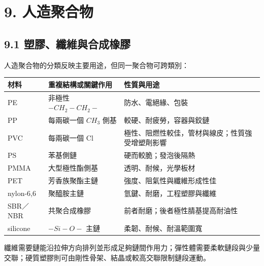 \documentclass[11pt,a4paper]{article}
\newcounter{none}
\begin{document}
\section{9. 人造聚合物}\label{ux4ebaux9020ux805aux5408ux7269}

\subsection{9.1 塑膠、纖維與合成橡膠}\label{ux5851ux81a0ux7e96ux7dadux8207ux5408ux6210ux6a61ux81a0}

人造聚合物的分類反映主要用途，但同一聚合物可跨類別：

{\def\LTcaptype{none} %
\begin{longtable}[]{@{}
  >{\raggedright\arraybackslash}p{}
  >{\raggedright\arraybackslash}p{}
  >{\raggedright\arraybackslash}p{}@{}}
\toprule\noalign{}
\begin{minipage}[b]{\linewidth}\raggedright
材料
\end{minipage} & \begin{minipage}[b]{\linewidth}\raggedright
重複結構或關鍵作用
\end{minipage} & \begin{minipage}[b]{\linewidth}\raggedright
性質與用途
\end{minipage} \\
\midrule\noalign{}
\endhead
\bottomrule\noalign{}
\endlastfoot
PE & 非極性 \(-CH_2-CH_2-\) & 防水、電絕緣、包裝 \\
PP & 每兩碳一個 \(CH_3\) 側基 & 較硬、耐疲勞，容器與鉸鏈 \\
PVC & 每兩碳一個 Cl & 極性、阻燃性較佳，管材與線皮；性質強受增塑劑影響 \\
PS & 苯基側鏈 & 硬而較脆；發泡後隔熱 \\
PMMA & 大型極性酯側基 & 透明、耐候，光學板材 \\
PET & 芳香族聚酯主鏈 & 強度、阻氣性與纖維形成性佳 \\
nylon-6,6 & 聚醯胺主鏈 & 氫鍵、耐磨，工程塑膠與纖維 \\
SBR／NBR & 共聚合成橡膠 & 前者耐磨；後者極性腈基提高耐油性 \\
silicone & \(-Si-O-\) 主鏈 & 柔韌、耐候、耐溫範圍寬 \\
\end{longtable}
}

纖維需要鏈能沿拉伸方向排列並形成足夠鏈間作用力；彈性體需要柔軟鏈段與少量交聯；硬質塑膠則可由剛性骨架、結晶或較高交聯限制鏈段運動。
\end{document}
